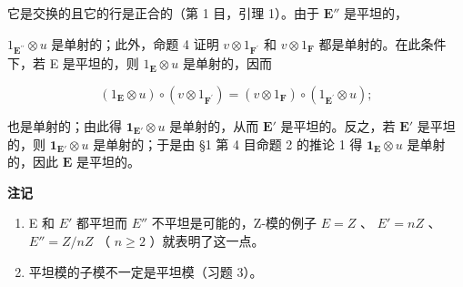 它是交换的且它的行是正合的（第 1 目，引理 1）。由于 \(\mathbf{E}''\) 是平坦的，

\(1_{\mathbf{E}^{\prime \prime}} \otimes u\) 是单射的；此外，命题 4 证明 \(v \otimes 1_{\mathbf{F}^{\prime}}\) 和 \(v \otimes 1_{\mathbf{F}}\) 都是单射的。在此条件下，若 E 是平坦的，则 \(1_{\mathbf{E}} \otimes u\) 是单射的，因而

\[
\left(1 _ {\mathbf {E}} \otimes u\right) \circ (v \otimes 1 _ {\mathbf {F} ^ {\prime}}) = (v \otimes 1 _ {\mathbf {F}}) \circ \left(1 _ {\mathbf {E} ^ {\prime}} \otimes u\right);
\]

也是单射的；由此得 \(\mathbf{1}_{\mathbf{E}'} \otimes u\) 是单射的，从而 \(\mathbf{E}'\) 是平坦的。反之，若 \(\mathbf{E}'\) 是平坦的，则 \(\mathbf{1}_{\mathbf{E}'} \otimes u\) 是单射的；于是由 §1 第 4 目命题 2 的推论 1 得 \(\mathbf{1}_{\mathbf{E}} \otimes u\) 是单射的，因此 \(\mathbf{E}\) 是平坦的。

\textbf{注记}\par

\begin{enumerate}
\def\labelenumi{(\arabic{enumi})}
\item
  E 和 \(E'\) 都平坦而 \(E''\) 不平坦是可能的，Z-模的例子 \(E = Z\) 、 \(E' = nZ\) 、 \(E'' = Z/nZ\) （ \(n \geqslant 2\) ）就表明了这一点。
\item
  平坦模的子模不一定是平坦模（习题 3）。
\end{enumerate}

